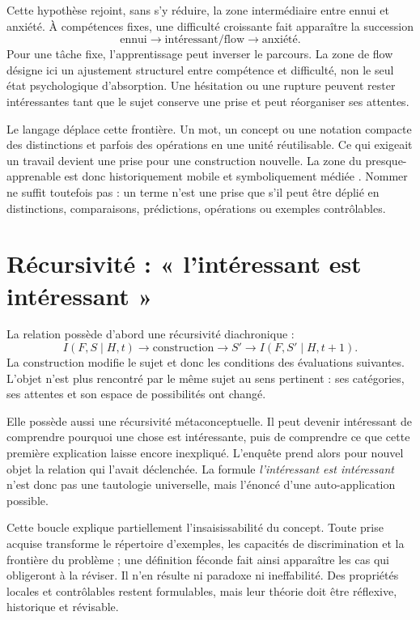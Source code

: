 \documentclass[11pt,a4paper]{article}
\begin{document}
Cette hypothèse rejoint, sans s'y réduire, la zone intermédiaire entre ennui et
anxiété. À compétences fixes, une difficulté croissante fait apparaître la
succession
\[
  \text{ennui}\longrightarrow\text{intéressant/flow}
  \longrightarrow\text{anxiété}.
\]
Pour une tâche fixe, l'apprentissage peut inverser le parcours. La zone de flow
désigne ici un ajustement structurel entre compétence et difficulté, non le seul
état psychologique d'absorption. Une hésitation ou une rupture peuvent rester
intéressantes tant que le sujet conserve une prise et peut réorganiser ses
attentes.

Le langage déplace cette frontière. Un mot, un concept ou une notation compacte
des distinctions et parfois des opérations en une unité réutilisable. Ce qui
exigeait un travail devient une prise pour une construction nouvelle. La zone
du presque-apprenable est donc historiquement mobile et symboliquement médiée
\parencite{vygotsky1978mind,lenat1991thresholds,lenat2008turtle,koestler1989act,steels2005coordinating,steels2015talkingheads}.
Nommer ne suffit toutefois pas : un terme n'est une prise que s'il peut être
déplié en distinctions, comparaisons, prédictions, opérations ou exemples
contrôlables.

\section{Récursivité : « l'intéressant est intéressant »}

La relation possède d'abord une récursivité diachronique :
\[
  I(F,S\mid H,t)\longrightarrow
  \text{construction}\longrightarrow S'
  \longrightarrow I(F,S'\mid H,t+1).
\]
La construction modifie le sujet et donc les conditions des évaluations
suivantes. L'objet n'est plus rencontré par le même sujet au sens pertinent :
ses catégories, ses attentes et son espace de possibilités ont changé.

Elle possède aussi une récursivité métaconceptuelle. Il peut devenir intéressant
de comprendre pourquoi une chose est intéressante, puis de comprendre ce que
cette première explication laisse encore inexpliqué. L'enquête prend alors pour
nouvel objet la relation qui l'avait déclenchée. La formule
\emph{l'intéressant est intéressant} n'est donc pas une tautologie universelle,
mais l'énoncé d'une auto-application possible.

Cette boucle explique partiellement l'insaisissabilité du concept. Toute prise
acquise transforme le répertoire d'exemples, les capacités de discrimination et
la frontière du problème ; une définition féconde fait ainsi apparaître les cas
qui obligeront à la réviser. Il n'en résulte ni paradoxe ni ineffabilité. Des
propriétés locales et contrôlables restent formulables, mais leur théorie doit
être réflexive, historique et révisable.
\end{document}

